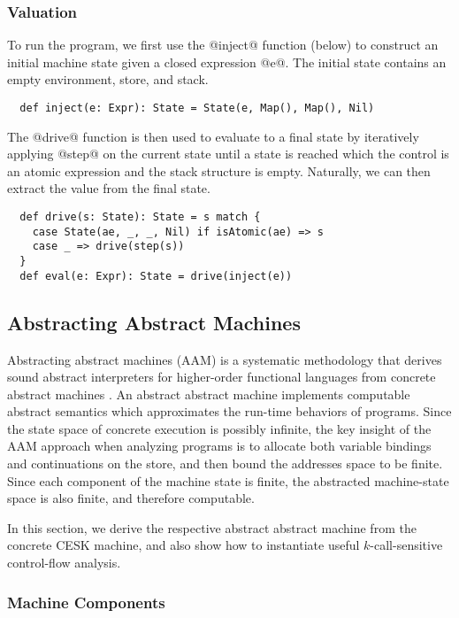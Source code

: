 \documentclass[acmsmall, screen]{acmart}\settopmatter{}
\begin{document}
\subsubsection{Valuation}\label{sec:drive}

To run the program, we first use the @inject@ function (below) to construct an initial
machine state given a closed expression @e@. The initial state contains an empty environment,
store, and stack.
\begin{lstlisting}
  def inject(e: Expr): State = State(e, Map(), Map(), Nil)
\end{lstlisting}

The @drive@ function is then used to evaluate to a final state by iteratively applying
@step@ on the current state until a state is reached which the control is an atomic
expression and the stack structure is empty. Naturally, we can then extract the value
from the final state.

\begin{lstlisting}
  def drive(s: State): State = s match {
    case State(ae, _, _, Nil) if isAtomic(ae) => s
    case _ => drive(step(s))
  }
  def eval(e: Expr): State = drive(inject(e))
\end{lstlisting}

\subsection{Abstracting Abstract Machines} \label{aam}
Abstracting abstract machines (AAM) is a systematic methodology that derives sound
abstract interpreters for higher-order functional languages from concrete abstract
machines \cite{van2012systematic, van2010abstracting}. An abstract abstract machine
implements computable abstract semantics which approximates the run-time behaviors of
programs.
Since the state space of concrete execution is possibly infinite, the key insight of the
AAM approach when analyzing programs is to allocate both variable bindings and continuations
on the store, and then bound the addresses space to be finite. Since each component
of the machine state is finite, the abstracted machine-state space is also finite,
and therefore computable.

In this section, we derive the respective abstract abstract machine from the concrete
CESK machine, and also show how to instantiate useful $k$-call-sensitive
control-flow analysis.

\subsubsection{Machine Components}
\end{document}
